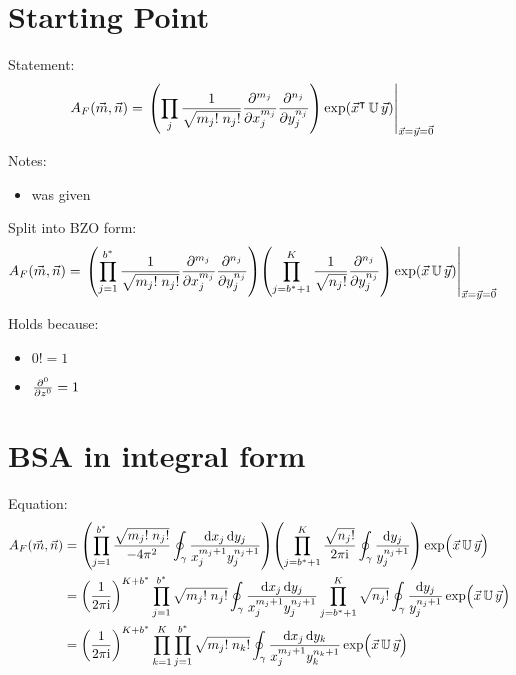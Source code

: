 \documentclass[
	english,
	a4paper,
	fontsize=10pt,
	parskip=half,
	titlepage=true,
	DIV=12,
	final
]{scrreprt}
\newcommand*{\transp}{\ensuremath{^\intercal}}
\newcommand*{\iunit}{\ensuremath{\mathrm{i}}}
\begin{document}
\section{Starting Point}
Statement:
\begin{align}
	A_F(\vec{m}, \vec{n})
&=
	\eval{\qty(
			\prod_{j}
			\frac
				{1}
				{\sqrt{m_j! \; n_j!}}
			\pdv[m_j]{x_j}
			\pdv[n_j]{y_j}
		) \exp(\vec{x}\transp \, \mathbb{U} \, \vec{y})
	}_{\vec{x} = \vec{y} = \vec{0}}
\label{eqn:BSA_raw}
\end{align}

Notes:
\begin{itemize}
\item was given
\end{itemize}

Split into BZO form:
\begin{align}
	A_F(\vec{m}, \vec{n})
&=
	\eval{
		\qty(
			\prod_{j=1}^{b^*}
			\frac
				{1}
				{\sqrt{m_j! \; n_j!}}
			\pdv[m_j]{x_j}
			\pdv[n_j]{y_j}
		)
		\qty(
			\prod_{j=b^* + 1}^{K}
			\frac
				{1}
				{\sqrt{n_j!}}
			\pdv[n_j]{y_j}
		)
		\exp(\vec{x} \, \mathbb{U} \, \vec{y})
	}_{\vec{x} = \vec{y} = \vec{0}}
\label{eqn:BSA_raw_BZO}
\end{align}

Holds because:
\begin{itemize}
\item $0! = 1$
\item $\pdv[0]{z} = 1$
\end{itemize}

\section{BSA in integral form}
Equation:
\begin{align}
	A_F(\vec{m}, \vec{n})
&=
	\qty(
		\prod_{j=1}^{b^*}
			\frac
				{\sqrt{m_j! \; n_j!}}
				{-4\pi^{2}}
			\oint_{\gamma}
				\frac
					{\dd{x_j} \dd{y_j}}
					{x_j^{m_j+1}  y_j^{n_j+1}}
	)
	\qty(
		\prod_{j=b^* + 1}^{K}
			\frac
				{\sqrt{n_j !}}
				{2\pi\iunit}
			\oint_{\gamma}
				\frac
					{\dd{y_j}}
					{y_j^{n_j + 1}}
	)
	\exp( \Big. \vec{x} \, \mathbb{U} \, \vec{y}) \\
&=
	\qty(
		\frac{1}{2\pi\iunit}
	)^{K + b^*}
		\prod_{j=1}^{b^*}
			\sqrt{m_j! \; n_j!}
			\oint_{\gamma}
				\frac
					{\dd{x_j} \dd{y_j}}
					{x_j^{m_j+1}  y_j^{n_j+1}}
		\prod_{j=b^* + 1}^{K}
			\sqrt{n_j !}
			\oint_{\gamma}
				\frac
					{\dd{y_j}}
					{y_j^{n_j + 1}}
	\exp( \Big. \vec{x} \, \mathbb{U} \, \vec{y}) \\
&=
	\qty(
		\frac{1}{2\pi\iunit}
	)^{K + b^*}
	\prod_{k=1}^{K}
	\prod_{j=1}^{b^*}
		\sqrt{m_j! \; n_k!}
		\oint_{\gamma}
			\frac
				{\dd{x_j} \dd{y_k}}
				{x_j^{m_j+1}  y_k^{n_k+1}}
	\exp( \Big. \vec{x} \, \mathbb{U} \, \vec{y})
	\label{eqn:BSA_Int_BZO}
\end{align}
\end{document}
